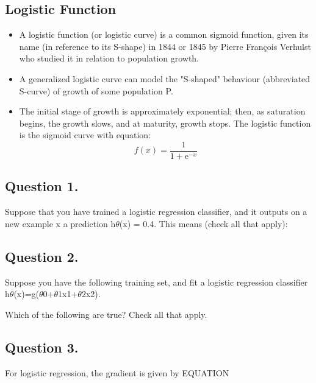 \documentclass[11pt]{article} %
\begin{document}
	\subsection{Logistic Function}
	\begin{itemize}
		\item A logistic function (or logistic curve) is a common sigmoid function, given its name (in reference to its S-shape) in 1844 or 1845 by Pierre François Verhulst who studied it in relation to population growth. 
		
		\item A generalized logistic curve can model the "S-shaped" behaviour (abbreviated S-curve) of growth of some population P. 
		
		\item The initial stage of growth is approximately exponential; then, as saturation begins, the growth slows, and at maturity, growth stops.
		The logistic function is the sigmoid curve with equation:
		\[ f(x) = \frac{1}{1 + \mathrm e^{-x}} \]
		
	\end{itemize}
	
	
	\subsection{Question 1. }
	Suppose that you have trained a logistic regression classifier, and it outputs on a new example x a prediction h$\theta$(x) = 0.4. This means (check all that apply):
	
	\subsection{Question 2. }
	Suppose you have the following training set, and fit a logistic regression classifier h$\theta$(x)=g($\theta$0+$\theta$1x1+$\theta$2x2).
	
	
	
	Which of the following are true? Check all that apply.
	
	
	\subsection{Question 3. }
	For logistic regression, the gradient is given by EQUATION
	
\end{document}
